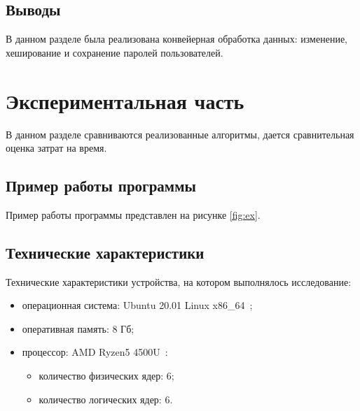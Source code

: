 \documentclass[12pt]{report}
\begin{document}
    \section{Выводы}
    В данном разделе была реализована конвейерная обработка данных: изменение, хеширование и сохранение паролей пользователей.
    \newpage
    
    \chapter{Экспериментальная часть}
    В данном разделе сравниваются реализованные алгоритмы, дается сравнительная оценка затрат на время.
    
    \section{Пример работы программы}
    Пример работы программы представлен на рисунке \ref{fig:ex}.
    
    \section{Технические характеристики}
    Технические характеристики устройства, на котором выполнялось исследование:
    \begin{itemize}
    	\item операционная система: Ubuntu 20.01 Linux x86\_64~\cite{ubuntu};
    	\item оперативная память: 8 Гб;
    	\item процессор: AMD Ryzen5 4500U~\cite{processor}:
    	\begin{itemize}
    		\item количество физических ядер: 6;
    		\item количество логических ядер: 6.
    	\end{itemize}
    \end{itemize}
    
\end{document}
